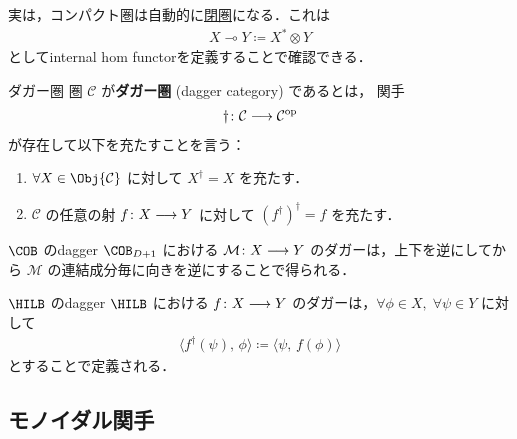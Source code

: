 \documentclass[TQFT_main]{subfiles}
\begin{document}
実は，コンパクト圏は自動的に\hyperref[def:closed-monoidal]{閉圏}になる．これは
\begin{align}
    X \multimap Y \coloneqq X^* \otimes Y
\end{align}
としてinternal hom functorを定義することで確認できる．


\begin{mydef}[label=def:dagger-monoidal]{ダガー圏}
    圏 $\mathcal{C}$ が\textbf{ダガー圏} (dagger category) であるとは，
    関手
    \begin{align}
        \dagger \colon \mathcal{C} \longrightarrow \mathcal{C}^{\mathrm{op}}
    \end{align}
    が存在して以下を充たすことを言う：
    \begin{enumerate}
        \item $\forall X \in \Obj{\mathcal{C}}$ に対して $X^\dagger = X$ を充たす．
        \item $\mathcal{C}$ の任意の射 $f \colon X \longrightarrow Y$ に対して $(f^\dagger)^\dagger = f$ を充たす．
    \end{enumerate}
\end{mydef}

\begin{myexample}[label=ex:Cob-dagger]{$\COB$ のdagger}
    $\COB_{D+1}$ における $\mathcal{M} \colon X \longrightarrow Y$ のダガーは，上下を逆にしてから $\mathcal{M}$ の連結成分毎に向きを逆にすることで得られる．
\end{myexample}


\begin{myexample}[label=ex:Hilb-dagger]{$\HILB$ のdagger}
    $\HILB$ における $f\colon X \longrightarrow Y$ のダガーは，$\forall \phi \in X,\; \forall \psi \in Y$ に対して
    \begin{align}
        \langle f^\dagger (\psi),\, \phi \rangle \coloneqq \langle \psi,\, f(\phi) \rangle
    \end{align}
    とすることで定義される．
\end{myexample}

\subsection{モノイダル関手}
\end{document}
